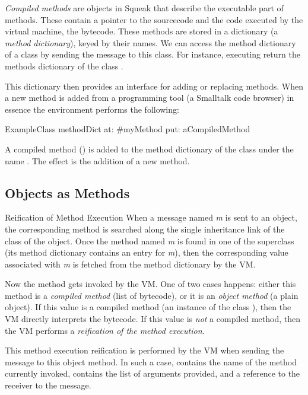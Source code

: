 \documentclass[a4paper,10pt,twoside]{book}
\begin{document}
\emph{Compiled methods} are objects in Squeak that describe the executable part of methods. These contain a pointer
to the sourcecode and the code executed by the virtual machine, the bytecode.
These methods are stored in a dictionary (a \emph{method dictionary}), keyed by their names. We can access the method dictionary of a class by sending the message  to this class. For instance, executing  return the methods dictionary of the class .

This dictionary then provides an interface for adding or replacing methods. When a new method is added from a programming tool (\eg a Smalltalk code browser) in essence the environment performs the following:

\begin{code}{}
ExampleClass methodDict at: #myMethod 
                                  put: aCompiledMethod
\end{code}

A compiled method () is added to the method dictionary of the class  under the name . The effect is the addition of a new method.

\subsection{Objects as Methods}%
Reification of Method Execution
When a message named \emph{m} is sent to an object, the corresponding method is searched along the single inheritance link of the class of the object. Once the method named \emph{m} is found in one of the superclass (\ie its method dictionary contains an entry for \emph{m}), then the corresponding value associated with \emph{m} is fetched from the method dictionary by the VM. 

Now the method gets invoked by the VM. One of two cases happens: either this method is a \emph{compiled method} (\ie list of bytecode), or it is an \emph{object method} (a plain object). If this value is a compiled method (an instance of the class ), then the VM directly interprets the bytecode. If this value is \emph{not} a compiled method, then the VM performs a \emph{reification of the method execution}.

This method execution reification is performed by the VM when sending the message  to this object method. In such a case,  contains the name of the method currently invoked,  contains the list of arguments provided, and  a reference to the receiver to the message.
\end{document}
